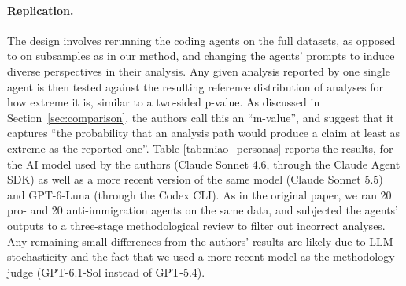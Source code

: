 \documentclass[10pt]{article}
\begin{document}
\paragraph{Replication.} The design involves rerunning the coding agents on the full datasets, as opposed to on subsamples as in our method, and changing the agents' prompts to induce diverse perspectives in their analysis. Any given analysis reported by one single agent is then tested against the resulting reference distribution of analyses for how extreme it is, similar to a two-sided p-value. As discussed in Section~\ref{sec:comparison}, the authors call this an ``m-value'', and suggest that it captures ``the probability that an analysis path would produce a claim at least as extreme as the reported one''. Table \ref{tab:miao_personas} reports the results, for the AI model used by the authors (Claude Sonnet 4.6, through the Claude Agent SDK) as well as a more recent version of the same  model (Claude Sonnet 5.5) and GPT-6-Luna (through the Codex CLI). As in the original paper, we ran 20 pro- and 20 anti-immigration agents on the same data, and subjected the agents' outputs to a three-stage methodological review to filter out incorrect analyses. Any remaining small differences from the authors' results are likely due to LLM stochasticity and the fact that we used a more recent model as the methodology judge (GPT-6.1-Sol instead of GPT-5.4).

\begin{table}[!htbp]
\centering
\small
\caption{Immigration: persona design of \citet{miao2026agentic}}
\label{tab:miao_personas}

\end{table}
\end{document}
